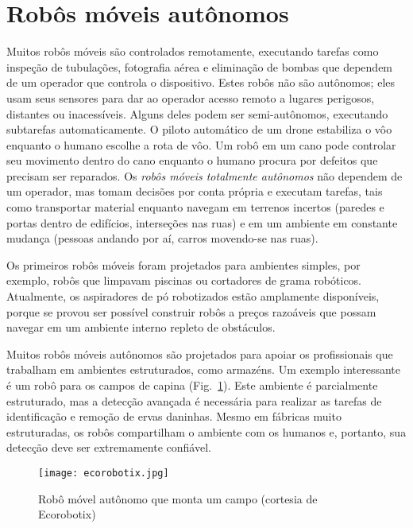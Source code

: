 \section{Robôs móveis autônomos}

Muitos robôs móveis são controlados remotamente, executando tarefas como inspeção de tubulações, fotografia aérea e eliminação de bombas que dependem de um operador que controla o dispositivo. Estes robôs não são autônomos; eles usam seus sensores para dar ao operador acesso remoto a lugares perigosos, distantes ou inacessíveis. Alguns deles podem ser semi-autônomos, executando subtarefas automaticamente. O piloto automático de um drone estabiliza o vôo enquanto o humano escolhe a rota de vôo. Um robô em um cano pode controlar seu movimento dentro do cano enquanto o humano procura por defeitos que precisam ser reparados. Os \emph{robôs móveis totalmente autônomos} não dependem de um operador, mas tomam decisões por conta própria e executam tarefas, tais como transportar material enquanto navegam em terrenos incertos (paredes e portas dentro de edifícios, interseções nas ruas) e em um ambiente em constante mudança (pessoas andando por aí, carros movendo-se nas ruas).

Os primeiros robôs móveis foram projetados para ambientes simples, por exemplo, robôs que limpavam piscinas ou cortadores de grama robóticos. Atualmente, os aspiradores de pó robotizados estão amplamente disponíveis, porque se provou ser possível construir robôs a preços razoáveis que possam navegar em um ambiente interno repleto de obstáculos.

Muitos robôs móveis autônomos são projetados para apoiar os profissionais que trabalham em ambientes estruturados, como armazéns. Um exemplo interessante é um robô para os campos de capina (Fig.~\ref{fig.agri_robot}). Este ambiente é parcialmente estruturado, mas a detecção avançada é necessária para realizar as tarefas de identificação e remoção de ervas daninhas. Mesmo em fábricas muito estruturadas, os robôs compartilham o ambiente com os humanos e, portanto, sua detecção deve ser extremamente confiável.

\begin{figure}
\begin{center}
\texttt{[image: ecorobotix.jpg]}
\end{center}
\caption{Robô móvel autônomo que monta um campo (cortesia de Ecorobotix)}\label{fig.agri_robot}
\end{figure}

